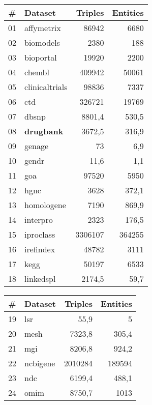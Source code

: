 \begin{table}[htpb]
\centering
\begin{tabular}{|c|l|r|r|}
  \hline
  \bf{\#} & \bf{Dataset} & \bf{Triples} & \bf{Entities} \\\hline
  01 & affymetrix     &   86942 &   6680\\\hline
  02 & biomodels      &    2380 &    188\\\hline
  03 & bioportal      &   19920 &   2200\\\hline
  04 & chembl         &  409942 &  50061\\\hline
  05 & clinicaltrials &   98836 &   7337\\\hline
  06 & ctd            &  326721 &  19769\\\hline
  07 & dbsnp          &  8801,4 &  530,5\\\hline
  08 & \bf{drugbank}  &  3672,5 &  316,9\\\hline
  09 & genage         &      73 &    6,9\\\hline
  10 & gendr          &    11,6 &    1,1\\\hline
  11 & goa            &   97520 &   5950\\\hline
  12 & hgnc           &    3628 &  372,1\\\hline
  13 & homologene     &    7190 &  869,9\\\hline
  14 & interpro       &    2323 &  176,5\\\hline
  15 & iproclass      & 3306107 & 364255\\\hline
  16 & irefindex      &   48782 &   3111\\\hline
  17 & kegg           &   50197 &   6533\\\hline
  18 & linkedspl      &  2174,5 &   59,7\\\hline
\end{tabular}
\hspace{1mm}
\begin{tabular}{|c|l|r|r|}
  \hline
  \bf{\#} & \bf{Dataset} & \bf{Triples} & \bf{Entities} \\\hline
  19 & lsr         &     55,9 &       5\\\hline
  20 & mesh        &   7323,8 &   305,4\\\hline
  21 & mgi         &   8206,8 &   924,2\\\hline
  22 & ncbigene    &  2010284 &  189594\\\hline
  23 & ndc         &   6199,4 &   488,1\\\hline
  24 & omim        &   8750,7 &    1013\\\hline

\end{tabular}
\end{table}
